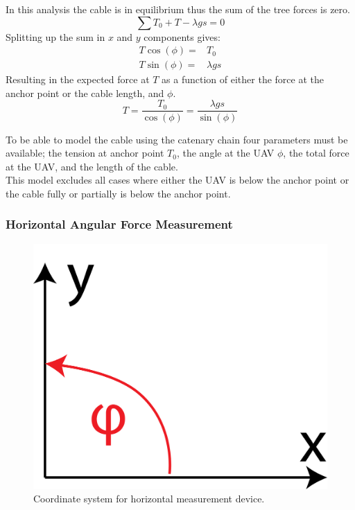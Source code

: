 \noindent
In this analysis the cable is in equilibrium thus the sum of the tree forces is zero. 
\begin{equation}
\sum T_0 + T -\lambda gs = 0
\end{equation}
Splitting up the sum in $x$ and $y$ components gives:
\begin{eqnarray}
T\cos(\phi) =& T_0 \\
T \sin(\phi) =& \lambda g s
\end{eqnarray}
Resulting in the expected force at $T$ as a function of either the force at the anchor point or the cable length, and $\phi$.
\begin{equation}
T = \frac{T_0}{\cos(\phi)} = \frac{\lambda g s}{\sin(\phi)}
\end{equation}

\noindent
To be able to model the cable using the catenary chain four parameters must be available; the tension at anchor point $T_0$, the angle at the UAV $\phi$, the total force at the UAV, and the length of the cable.\\

\noindent
This model excludes all cases where either the UAV is below the anchor point or the cable fully or partially is below the anchor point.



   

\subsubsection{Horizontal Angular Force Measurement}
\label{sec:horizontalMeasurementAnalysis}
\begin{figure}[hbtp]
\centering
\includegraphics[scale=0.25]{graphics/horizontal_coordinatesystem.png}
\caption{Coordinate system for horizontal measurement device.}
\end{figure}

